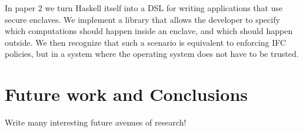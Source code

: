 In paper 2 we turn Haskell itself into a DSL for writing applications that use secure enclaves. We implement a library that
allows the developer to specify which computations should happen inside an enclave, and which should happen outside. We
then recognize that such a scenario is equivalent to enforcing IFC policies, but in a system where the operating system
does not have to be trusted.

\section{Future work and Conclusions}

Write many interesting future avenues of research!











